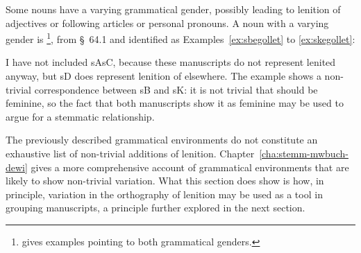 Some nouns have a varying grammatical gender, possibly leading to lenition of adjectives or following articles or personal pronouns. A noun with a varying gender  is   \footnote{\Textcite[s.v.~]{bevan_geiriadur_2014} gives examples pointing to both grammatical genders.}, from §~64.1 and identified as Examples~\ref{ex:sbegollet} to \ref{ex:skegollet}:
\begin{mwl}
\end{mwl}
I have not included \gls{sA}\gls{sC}, because these manuscripts do not represent lenited  anyway, but \gls{sD} does represent lenition of  elsewhere. The example shows a non-trivial correspondence between \gls{sB} and \gls{sK}: it is not trivial that  should be feminine, so the fact that both manuscripts show it as feminine may be used to argue for a stemmatic relationship.

The previously described grammatical environments do not constitute an exhaustive list of non-trivial additions of lenition. Chapter~\ref{cha:stemm-mwbuch-dewi} gives a more comprehensive account of grammatical environments that are likely to show non-trivial variation. What this section does show is how, in principle, variation in the orthography of lenition may be used as a tool in grouping manuscripts, a  principle further explored in the next section.

